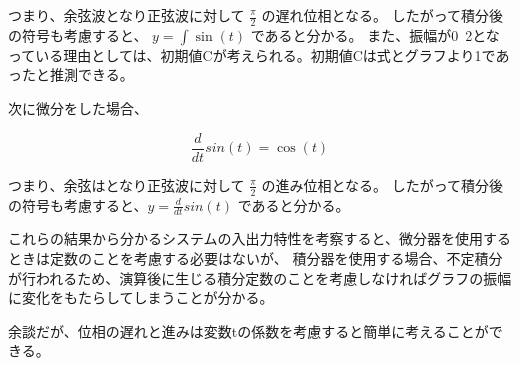 \documentclass[10pt,a4paper,titlepage]{jreport} %
\begin{document}
つまり、余弦波となり正弦波に対して $\frac{\pi}{2}$ の遅れ位相となる。
したがって積分後の符号も考慮すると、 $y = \int \sin(t)$ であると分かる。 
また、振幅が0~2となっている理由としては、初期値Cが考えられる。初期値Cは式とグラフより1であったと推測できる。

次に微分をした場合、

\begin{equation}
\frac{d}{dt} sin(t) = \cos(t)
\end{equation}

つまり、余弦はとなり正弦波に対して $\frac{\pi}{2}$ の進み位相となる。
したがって積分後の符号も考慮すると、$y = \frac{d}{dt} sin(t)$ であると分かる。

これらの結果から分かるシステムの入出力特性を考察すると、微分器を使用するときは定数のことを考慮する必要はないが、
積分器を使用する場合、不定積分が行われるため、演算後に生じる積分定数のことを考慮しなければグラフの振幅に変化をもたらしてしまうことが分かる。

余談だが、位相の遅れと進みは変数tの係数を考慮すると簡単に考えることができる。
\end{document}
